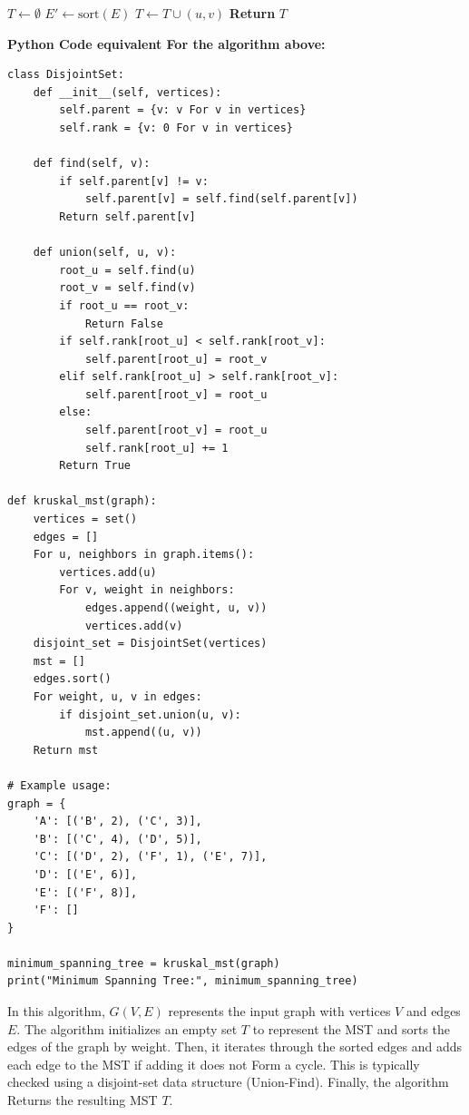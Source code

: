 \documentclass[12pt]{book} %
\begin{document}
\begin{algorithm}[H]
\caption{Kruskal's Algorithm For Minimum Spanning Tree}
\begin{algorithmic}[1]
\State $T \gets \emptyset$ 
\State $E' \gets \text{sort}(E)$ 
\State $T \gets T \cup {(u, v)}$ 
\EndIf
\EndFor
\State \textbf{Return} $T$ 
\EndProcedure
\end{algorithmic}
\end{algorithm}
\FloatBarrier
\textbf{Python Code equivalent For the algorithm above:}
\FloatBarrier
\begin{lstlisting}
class DisjointSet:
    def __init__(self, vertices):
        self.parent = {v: v For v in vertices}
        self.rank = {v: 0 For v in vertices}

    def find(self, v):
        if self.parent[v] != v:
            self.parent[v] = self.find(self.parent[v])
        Return self.parent[v]

    def union(self, u, v):
        root_u = self.find(u)
        root_v = self.find(v)
        if root_u == root_v:
            Return False
        if self.rank[root_u] < self.rank[root_v]:
            self.parent[root_u] = root_v
        elif self.rank[root_u] > self.rank[root_v]:
            self.parent[root_v] = root_u
        else:
            self.parent[root_v] = root_u
            self.rank[root_u] += 1
        Return True

def kruskal_mst(graph):
    vertices = set()
    edges = []
    For u, neighbors in graph.items():
        vertices.add(u)
        For v, weight in neighbors:
            edges.append((weight, u, v))
            vertices.add(v)
    disjoint_set = DisjointSet(vertices)
    mst = []
    edges.sort()
    For weight, u, v in edges:
        if disjoint_set.union(u, v):
            mst.append((u, v))
    Return mst

# Example usage:
graph = {
    'A': [('B', 2), ('C', 3)],
    'B': [('C', 4), ('D', 5)],
    'C': [('D', 2), ('F', 1), ('E', 7)],
    'D': [('E', 6)],
    'E': [('F', 8)],
    'F': []
}

minimum_spanning_tree = kruskal_mst(graph)
print("Minimum Spanning Tree:", minimum_spanning_tree)
\end{lstlisting}
\FloatBarrier
In this algorithm, $G(V, E)$ represents the input graph with vertices $V$ and edges $E$. The algorithm initializes an empty set $T$ to represent the MST and sorts the edges of the graph by weight. Then, it iterates through the sorted edges and adds each edge to the MST if adding it does not Form a cycle. This is typically checked using a disjoint-set data structure (Union-Find). Finally, the algorithm Returns the resulting MST $T$.
\end{document}
